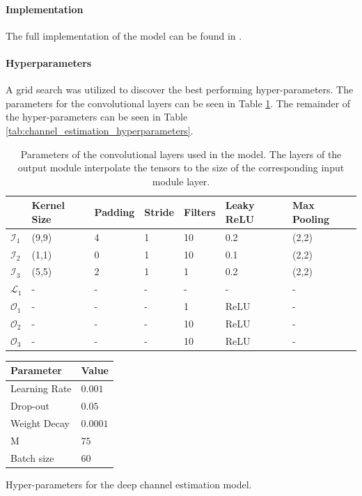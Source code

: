 \paragraph{Implementation}
The full implementation of the model can be found in \cite{Thrane2020RepositoryLearning}.


\paragraph{Hyperparameters}
A grid search was utilized to discover the best performing hyper-parameters. The parameters for the convolutional layers can be seen in Table \ref{tab:channel_estimation_hyperparameters_conv}. The remainder of the hyper-parameters can be seen in Table \ref{tab:channel_estimation_hyperparameters}.


\begin{table}[]
\footnotesize{
\begin{tabular}{@{}lllllll@{}}
\toprule
 & Kernel Size & Padding & Stride & Filters & Leaky ReLU & Max Pooling \\ \midrule
$\mathcal{I}_1$            & (9,9)       & 4       & 1      & 10      & 0.2        & (2,2)       \\
$\mathcal{I}_2$              & (1,1)       & 0       & 1      & 10      & 0.1        & (2,2)       \\
$\mathcal{I}_3$            & (5,5)       & 2       & 1      & 1       & 0.2        & (2,2)       \\
$\mathcal{L}_1$              & -           & -       & -      & -      & -          & -           \\
$\mathcal{O}_1$              & -           & -       & -      & 1       & ReLU       & -           \\
$\mathcal{O}_2$               & -           & -       & -      & 10      & ReLU       & -           \\
$\mathcal{O}_3$               & -           & -       & -      & 10      & ReLU       & -           \\ \bottomrule
\end{tabular}
\vspace{2em}
\caption{Parameters of the convolutional layers used in the model. The layers of the output module interpolate the tensors to the size of the corresponding input module layer.}\label{tab:channel_estimation_hyperparameters_conv}
}
\end{table}

\begin{margintable}
\begin{tabular}{@{}ll@{}}
Parameter     & Value  \\ \midrule
Learning Rate & $0.001$  \\
Drop-out      & $0.05$   \\
Weight Decay  & $0.0001$ \\
M             & $75$     \\
Batch size    & $60$    \\ \bottomrule
\end{tabular}
\caption{Hyper-parameters for the deep channel estimation model.}\label{tab:channel_estimation_hyperparameters}
\end{margintable}

